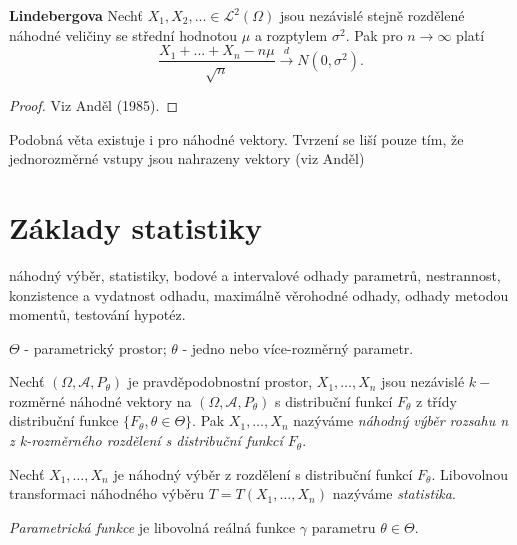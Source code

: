 \begin{theorem}{\textbf{Lindebergova}}
Nechť $X_{1}, X_{2}, ... \in \mathcal{L}^{2}(\Omega) $ jsou nezávislé stejně rozdělené náhodné veličiny se střední hodnotou $\mu$ a rozptylem $\sigma^{2}$. Pak pro $n \longrightarrow \infty$ platí 
\begin{equation}
\frac{X_{1}+ ... + X_{n} - n\mu}{\sqrt{n}} \xrightarrow{d} N(0, \sigma^{2}).
\end{equation}
\end{theorem}
\begin{proof}
Viz Anděl (1985).
\end{proof}

\begin{remark}
Podobná věta existuje i pro náhodné vektory. Tvrzení se liší pouze tím, že jednorozměrné vstupy jsou nahrazeny vektory (viz Anděl)
\end{remark}

\section{Základy statistiky}
náhodný  výběr,  statistiky,  bodové  a  intervalové  odhady parametrů,  nestrannost,  konzistence  a  vydatnost  odhadu, maximálně  věrohodné odhady, odhady metodou momentů, testování hypotéz.

$\Theta$ - parametrický prostor; $\theta$ - jedno nebo více-rozměrný parametr.

\begin{definition}
Nechť $\left(\Omega, \mathcal{A}, P_{\theta} \right)$ je pravděpodobnostní prostor, $X_1,\ldots,X_n$ jsou nezávislé $k-$rozměrné náhodné vektory na $\left(\Omega, \mathcal{A}, P_{\theta} \right)$ s distribuční funkcí $F_{\theta}$ z třídy distribuční funkce $\{F_{\theta}, \theta \in \Theta \}$. Pak  $X_1,\ldots,X_n$ nazýváme \textit{náhodný výběr rozsahu n z k-rozměrného rozdělení s distribuční funkcí $F_{\theta}$}. 
\end{definition}

\begin{definition}
Nechť $X_1,\ldots,X_n$ je náhodný výběr z rozdělení s distribuční funkcí $F_{\theta}$. Libovolnou transformaci náhodného výběru $T=T \left(X_1,\ldots,X_n \right)$ nazýváme \textit{statistika}. 
\end{definition}

\begin{definition}
\textit{Parametrická funkce} je libovolná reálná funkce $\gamma$ parametru $\theta \in \Theta$.
\end{definition}

